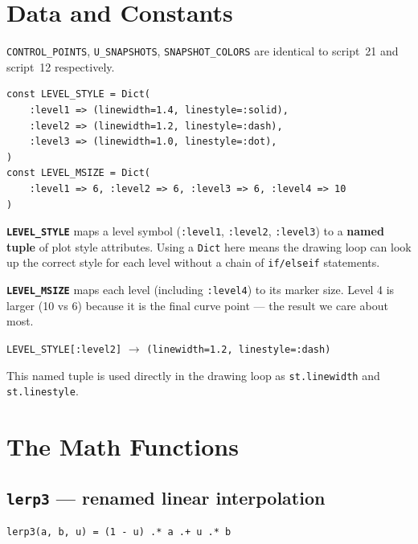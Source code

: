 \documentclass[12pt, a4paper]{article}
\newcommand{\cd}[1]{\texttt{#1}}
\begin{document}
\section{Data and Constants}

\cd{CONTROL\_POINTS}, \cd{U\_SNAPSHOTS}, \cd{SNAPSHOT\_COLORS}
are identical to script~21 and script~12 respectively.

\begin{verbatim}
const LEVEL_STYLE = Dict(
    :level1 => (linewidth=1.4, linestyle=:solid),
    :level2 => (linewidth=1.2, linestyle=:dash),
    :level3 => (linewidth=1.0, linestyle=:dot),
)
const LEVEL_MSIZE = Dict(
    :level1 => 6, :level2 => 6, :level3 => 6, :level4 => 10
)
\end{verbatim}

\textbf{\cd{LEVEL\_STYLE}} maps a level symbol (\cd{:level1},
\cd{:level2}, \cd{:level3}) to a \textbf{named tuple}
of plot style attributes.
Using a \cd{Dict} here means the drawing loop can look up
the correct style for each level without a chain of
\cd{if/elseif} statements.

\textbf{\cd{LEVEL\_MSIZE}} maps each level (including
\cd{:level4}) to its marker size.
Level 4 is larger (10 vs 6) because it is the final
curve point --- the result we care about most.

\begin{examplebox}
\cd{LEVEL\_STYLE[:level2]}
$\to$ \cd{(linewidth=1.2, linestyle=:dash)}

This named tuple is used directly in the drawing loop
as \cd{st.linewidth} and \cd{st.linestyle}.
\end{examplebox}


\section{The Math Functions}

\subsection{\texttt{lerp3} --- renamed linear interpolation}

\begin{verbatim}
lerp3(a, b, u) = (1 - u) .* a .+ u .* b
\end{verbatim}
\end{document}
